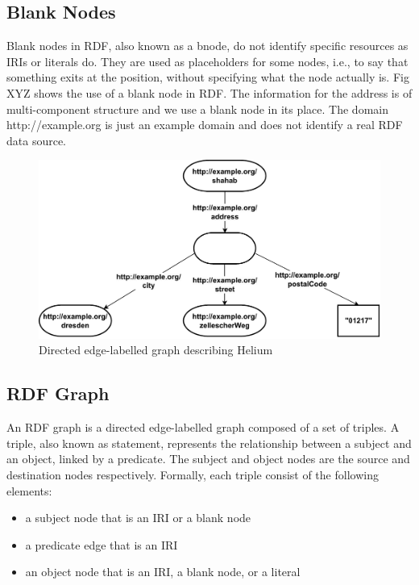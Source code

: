 \subsection*{Blank Nodes}
Blank nodes in RDF, also known as a bnode, do not identify specific resources as IRIs or literals do. They are used as placeholders for some nodes, i.e., to say that something exits at the position, without specifying what the node actually is. Fig XYZ shows the use of a blank node in RDF. The information for the address is of multi-component structure and we use a blank node in its place. The domain http://example.org is just an example domain and does not identify a real RDF data source.

\begin{figure}[h]
  \centering
  \includegraphics[width=0.80\linewidth]{images/blank_node.drawio.pdf}
  \caption{Directed edge-labelled graph describing Helium}
  \label{fig:figure 1}
\end{figure}

\subsection{RDF Graph}
\begin{definition}	
An RDF graph is a directed edge-labelled graph composed of a set of triples. A triple, also known as statement, represents the relationship between a subject and an object, linked by a predicate. The subject and object nodes are the source and destination nodes respectively. Formally, each triple consist of the following elements:   

\begin{itemize}
	\item a subject node that is an IRI or a blank node
	\item a predicate edge that is an IRI
	\item an object node that is an IRI, a blank node, or a literal
\end{itemize}	
\end{definition}

